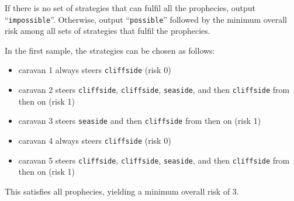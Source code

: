 \begin{Output}
If there is no set of strategies that can fulfil all the prophecies, output ``\texttt{impossible}''. Otherwise, output ``\texttt{possible}'' followed by the minimum overall risk among all sets of strategies that fulfil the prophecies.
\end{Output}

\remainingsamples

In the first sample, the strategies can be chosen as follows:
\begin{itemize}
	\item caravan 1 always steers \texttt{cliffside} (risk 0)
	\item caravan 2 steers \texttt{cliffside}, \texttt{cliffside}, \texttt{seaside}, and then \texttt{cliffside} from then on (risk 1)
	\item caravan 3 steers \texttt{seaside} and then \texttt{cliffside} from then on (risk 1)
	\item caravan 4 always steers \texttt{cliffside} (risk 0)
	\item caravan 5 steers \texttt{cliffside}, \texttt{cliffside}, \texttt{seaside}, and then \texttt{cliffside} from then on (risk 1)
\end{itemize}
This satisfies all prophecies, yielding a minimum overall risk of 3.
